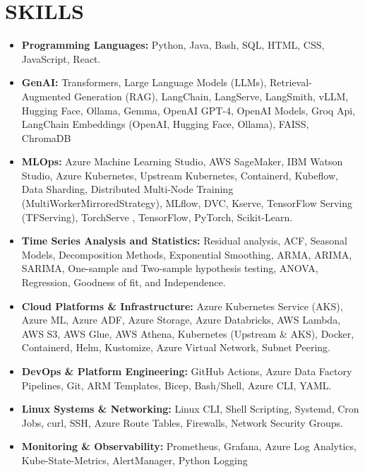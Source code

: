 \documentclass[10pt,letter]{article}
\newcommand{\boldlarger}[1]{\textbf{\normalsize #1}}
\begin{document}
\section*{SKILLS}
\begin{itemize}
  \item \boldlarger{Programming Languages:} Python, Java, Bash, SQL, HTML, CSS, JavaScript, React.

   \item \boldlarger{GenAI:} Transformers, Large Language Models (LLMs), Retrieval-Augmented Generation (RAG), LangChain, LangServe, LangSmith, vLLM, Hugging Face, Ollama, Gemma, OpenAI GPT-4, OpenAI Models, Groq Api, LangChain Embeddings (OpenAI, Hugging Face, Ollama), FAISS, ChromaDB

  \item \boldlarger{MLOps:} Azure Machine Learning Studio, AWS SageMaker, IBM Watson Studio, Azure Kubernetes, Upstream Kubernetes, Containerd, Kubeflow, Data Sharding, Distributed Multi-Node Training (MultiWorkerMirroredStrategy), MLflow, DVC, Kserve, TensorFlow Serving (TFServing), TorchServe , TensorFlow, PyTorch, Scikit-Learn.

    \item \boldlarger{Time Series Analysis and Statistics:} Residual analysis, ACF, Seasonal Models, Decomposition Methods, Exponential Smoothing, ARMA, ARIMA, SARIMA, One-sample and Two-sample hypothesis testing, ANOVA, Regression, Goodness of fit, and Independence.

  \item \boldlarger{Cloud Platforms \& Infrastructure:}  Azure Kubernetes Service (AKS), Azure ML, Azure ADF, Azure Storage, Azure Databricks, AWS Lambda, AWS S3, AWS Glue, AWS Athena, Kubernetes (Upstream \& AKS), Docker, Containerd, Helm, Kustomize, Azure Virtual Network, Subnet Peering.

  \item \boldlarger{DevOps \& Platform Engineering:} GitHub Actions, Azure Data Factory Pipelines, Git, ARM Templates, Bicep, Bash/Shell, Azure CLI, YAML.

  \item \boldlarger{Linux Systems \& Networking:} Linux CLI, Shell Scripting, Systemd, Cron Jobs, curl, SSH, Azure Route Tables, Firewalls, Network Security Groups.

  \item \boldlarger{Monitoring \& Observability:} Prometheus, Grafana, Azure Log Analytics, Kube-State-Metrics, AlertManager, Python Logging


\end{itemize}
\end{document}
